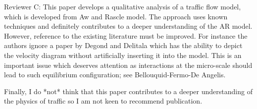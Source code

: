 \documentclass[preprint]{elsarticle}
\begin{document}
\newpage

Reviewer C: This paper develops a qualitative analysis of a traffic flow model, which is developed from Aw and Rascle model. The approach uses known techniques and definitely contributes to a deeper understanding of the AR model. However, reference to the existing literature must be improved. For instance the authors ignore a paper by Degond and Delitala which has the ability to depict the velocity diagram without artificially inserting it into the model. This is an important issue which deserves attention as interactions at the micro-scale should lead to such equilibrium configuration; see Bellouquid-Fermo-De Angelis.

Finally, I do *not* think that this paper contributes to a deeper understanding of the physics of traffic so I am not keen to recommend publication.
\end{document}
